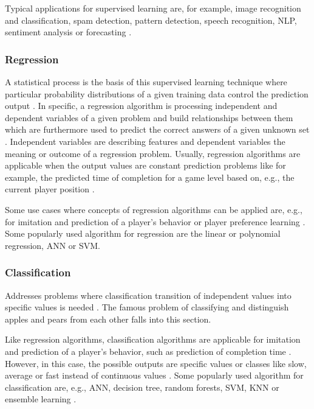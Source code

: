 \documentclass[MGS,Master,english]{twbook}%
\begin{document}
Typical applications for supervised learning are, for example, image recognition and classification, spam detection, pattern detection, speech recognition, \ac{NLP}, sentiment analysis or forecasting \cite{ml::book::algorithms}.

\subsubsection{Regression}
A statistical process is the basis of this supervised learning technique where particular probability distributions of a given training data control the prediction output \cite{ml::book::developer}. In specific, a regression algorithm is processing independent and dependent variables of a given problem and build relationships between them which are furthermore used to predict the correct answers of a given unknown set \cite{ml::book::developer}. Independent variables are describing features and dependent variables the meaning or outcome of a regression problem. Usually, regression algorithms are applicable when the output values are constant prediction problems like for example, the predicted time of completion for a game level based on, e.g., the current player position \cite{ai::book}.

Some use cases where concepts of regression algorithms can be applied are, e.g., for imitation and prediction of a player's behavior or player preference learning \cite{ai::book}. Some popularly used algorithm for regression are the linear or polynomial regression, \ac{ANN} or \ac{SVM}. \cite{ai::book}

\subsubsection{Classification}
Addresses problems where classification transition of independent values into specific values is needed \cite{ai::book}. The famous problem of classifying and distinguish apples and pears from each other falls into this section.

Like regression algorithms, classification algorithms are applicable for imitation and prediction of a player's behavior, such as prediction of completion time \cite{ai::book}. However, in this case, the possible outputs are specific values or classes like slow, average or fast instead of continuous values \cite{ai::book}. Some popularly used algorithm for classification are, e.g., \ac{ANN}, decision tree, random forests, \ac{SVM}, \ac{KNN} or ensemble learning \cite{ai::book}.
\end{document}
